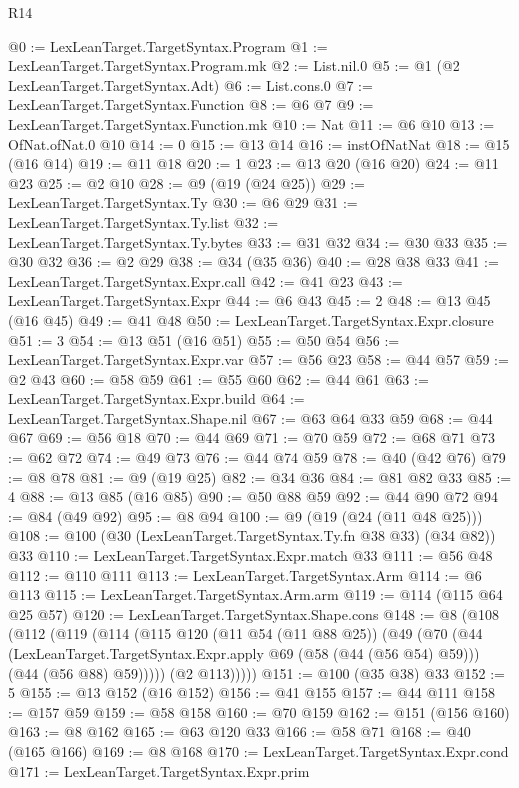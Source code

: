 \begin{lexlean}{R14}
\begin{coremodule}
{{{{{{{{{{{{{@0 := LexLeanTarget.TargetSyntax.Program
@1 := LexLeanTarget.TargetSyntax.Program.mk
@2 := List.nil.{0}
@5 := @1 (@2 LexLeanTarget.TargetSyntax.Adt)
@6 := List.cons.{0}
@7 := LexLeanTarget.TargetSyntax.Function
@8 := @6 @7
@9 := LexLeanTarget.TargetSyntax.Function.mk
@10 := Nat
@11 := @6 @10
@13 := OfNat.ofNat.{0} @10
@14 := 0
@15 := @13 @14
@16 := instOfNatNat
@18 := @15 (@16 @14)
@19 := @11 @18
@20 := 1
@23 := @13 @20 (@16 @20)
@24 := @11 @23
@25 := @2 @10
@28 := @9 (@19 (@24 @25))
@29 := LexLeanTarget.TargetSyntax.Ty
@30 := @6 @29
@31 := LexLeanTarget.TargetSyntax.Ty.list
@32 := LexLeanTarget.TargetSyntax.Ty.bytes
@33 := @31 @32
@34 := @30 @33
@35 := @30 @32
@36 := @2 @29
@38 := @34 (@35 @36)
@40 := @28 @38 @33
@41 := LexLeanTarget.TargetSyntax.Expr.call
@42 := @41 @23
@43 := LexLeanTarget.TargetSyntax.Expr
@44 := @6 @43
@45 := 2
@48 := @13 @45 (@16 @45)
@49 := @41 @48
@50 := LexLeanTarget.TargetSyntax.Expr.closure
@51 := 3
@54 := @13 @51 (@16 @51)
@55 := @50 @54
@56 := LexLeanTarget.TargetSyntax.Expr.var
@57 := @56 @23
@58 := @44 @57
@59 := @2 @43
@60 := @58 @59
@61 := @55 @60
@62 := @44 @61
@63 := LexLeanTarget.TargetSyntax.Expr.build
@64 := LexLeanTarget.TargetSyntax.Shape.nil
@67 := @63 @64 @33 @59
@68 := @44 @67
@69 := @56 @18
@70 := @44 @69
@71 := @70 @59
@72 := @68 @71
@73 := @62 @72
@74 := @49 @73
@76 := @44 @74 @59
@78 := @40 (@42 @76)
@79 := @8 @78
@81 := @9 (@19 @25)
@82 := @34 @36
@84 := @81 @82 @33
@85 := 4
@88 := @13 @85 (@16 @85)
@90 := @50 @88 @59
@92 := @44 @90 @72
@94 := @84 (@49 @92)
@95 := @8 @94
@100 := @9 (@19 (@24 (@11 @48 @25)))
@108 := @100 (@30 (LexLeanTarget.TargetSyntax.Ty.fn @38 @33) (@34 @82)) @33
@110 := LexLeanTarget.TargetSyntax.Expr.match @33
@111 := @56 @48
@112 := @110 @111
@113 := LexLeanTarget.TargetSyntax.Arm
@114 := @6 @113
@115 := LexLeanTarget.TargetSyntax.Arm.arm
@119 := @114 (@115 @64 @25 @57)
@120 := LexLeanTarget.TargetSyntax.Shape.cons
@148 := @8
    (@108
      (@112
        (@119
          (@114
            (@115
              @120
              (@11 @54 (@11 @88 @25))
              (@49
                (@70
                  (@44
                    (LexLeanTarget.TargetSyntax.Expr.apply @69 (@58 (@44 (@56 @54) @59)))
                    (@44 (@56 @88) @59)))))
            (@2 @113)))))
@151 := @100 (@35 @38) @33
@152 := 5
@155 := @13 @152 (@16 @152)
@156 := @41 @155
@157 := @44 @111
@158 := @157 @59
@159 := @58 @158
@160 := @70 @159
@162 := @151 (@156 @160)
@163 := @8 @162
@165 := @63 @120 @33
@166 := @58 @71
@168 := @40 (@165 @166)
@169 := @8 @168
@170 := LexLeanTarget.TargetSyntax.Expr.cond
@171 := LexLeanTarget.TargetSyntax.Expr.prim
}}}}}}}}}}}}}
\end{coremodule}
\end{lexlean}
